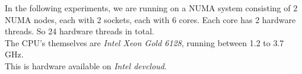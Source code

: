 In the following experiments, we are running on a NUMA system consisting of
2 NUMA nodes, each with 2 sockets, each with 6 cores.
Each core has 2 hardware threads. So 24 hardware threads in total.\\
The CPU's themselves are \emph{Intel Xeon Gold 6128}, running between 1.2 to 3.7 GHz.\\
This is hardware available on \emph{Intel devcloud}\cite{devcloud_landing}.